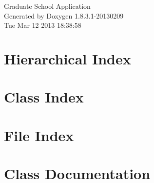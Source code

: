 \documentclass{book}
\begin{document}
\hypersetup{pageanchor=false,citecolor=blue}
\begin{titlepage}
\vspace*{7cm}
\begin{center}
{\Large Graduate School Application }\\
\vspace*{1cm}
{\large Generated by Doxygen 1.8.3.1-20130209}\\
\vspace*{0.5cm}
{\small Tue Mar 12 2013 18:38:58}\\
\end{center}
\end{titlepage}
\clearemptydoublepage
{}
\tableofcontents
\clearemptydoublepage
{}
\hypersetup{pageanchor=true,citecolor=blue}
\chapter{Hierarchical Index}

\chapter{Class Index}

\chapter{File Index}

\chapter{Class Documentation}
























\end{document}
